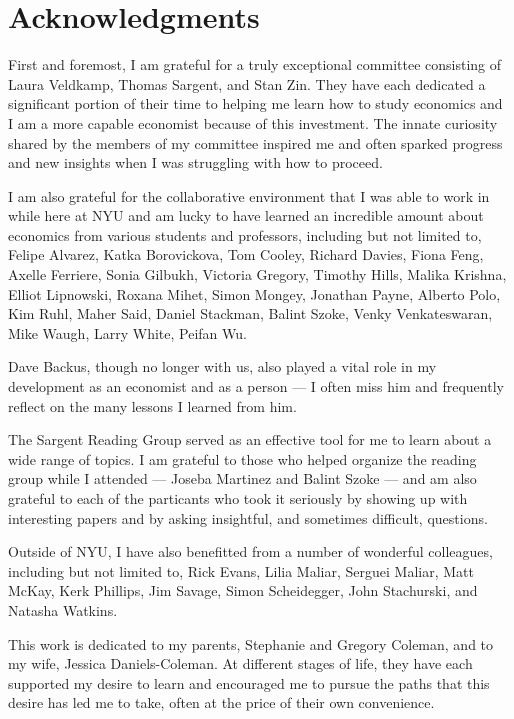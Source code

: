 \documentclass[12pt,letterpaper,oneside,final]{memoir}
\begin{document}
\newpage

\chapter{Acknowledgments}

  First and foremost, I am grateful for a truly exceptional committee consisting of Laura Veldkamp,
  Thomas Sargent, and Stan Zin. They have each dedicated a significant portion of their time to
  helping me learn how to study economics and I am a more capable economist because of this
  investment. The innate curiosity shared by the members of my committee inspired me and often
  sparked progress and new insights when I was struggling with how to proceed.

  I am also grateful for the collaborative environment that I was able to work in while here at NYU
  and am lucky to have learned an incredible amount about economics from various students and
  professors, including but not limited to, Felipe Alvarez, Katka Borovickova, Tom Cooley, Richard
  Davies, Fiona Feng, Axelle Ferriere, Sonia Gilbukh, Victoria Gregory, Timothy Hills, Malika
  Krishna, Elliot Lipnowski, Roxana Mihet, Simon Mongey, Jonathan Payne, Alberto Polo, Kim Ruhl,
  Maher Said, Daniel Stackman, Balint Szoke, Venky Venkateswaran, Mike Waugh, Larry White, Peifan
  Wu.

  Dave Backus, though no longer with us, also played a vital role in my development as an economist
  and as a person --- I often miss him and frequently reflect on the many lessons I learned from
  him.

  The Sargent Reading Group served as an effective tool for me to learn about a wide range of
  topics. I am grateful to those who helped organize the reading group while I attended --- Joseba
  Martinez and Balint Szoke --- and am also grateful to each of the particants who took it seriously
  by showing up with interesting papers and by asking insightful, and sometimes difficult,
  questions.

  Outside of NYU, I have also benefitted from a number of wonderful colleagues, including but not
  limited to, Rick Evans, Lilia Maliar, Serguei Maliar, Matt McKay, Kerk Phillips, Jim Savage, Simon
  Scheidegger, John Stachurski, and Natasha Watkins.

  This work is dedicated to my parents, Stephanie and Gregory Coleman, and to my wife, Jessica
  Daniels-Coleman. At different stages of life, they have each supported my desire to learn and
  encouraged me to pursue the paths that this desire has led me to take, often at the price of
  their own convenience.
\end{document}
